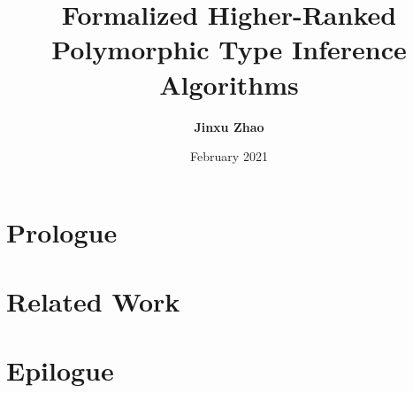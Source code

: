 



\title{Formalized Higher-Ranked Polymorphic Type Inference Algorithms}
\author{\textbf{Jinxu Zhao}}
\date{February 2021}




\maketitle

\begin{abstract}
 
\end{abstract}


\frontmatter
\makedeclaration
\makeAck
\tableofcontents
\listoffigures
\listoftables

\mainmatter

\part{Prologue}











\part{Related Work}



\part{Epilogue}





\cleardoublepage




